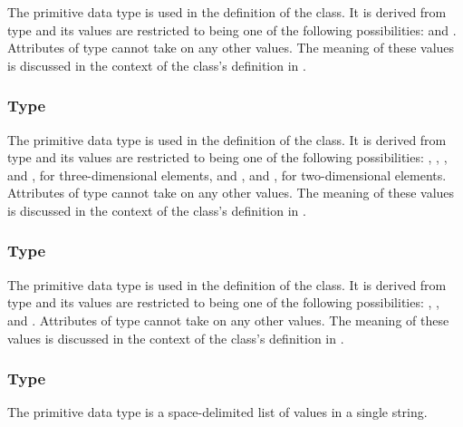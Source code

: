 The  primitive data type is used in the definition of the \ParametricObject class.  It is derived from type  and its values are restricted to being one of the following possibilities:  and .  Attributes of type  cannot take on any other values.  The meaning of these values is discussed in the context of the \ParametricObject class's definition in .


\subsubsection{Type \fixttspace{}}
\label{primtype-PrimitiveKind}

The  primitive data type is used in the definition of the \CSGPrimitive class.  It is derived from type  and its values are restricted to being one of the following possibilities: , , , and , for three-dimensional \CSGObject elements, and , and , for two-dimensional \CSGObject elements.  Attributes of type  cannot take on any other values.  The meaning of these values is discussed in the context of the \CSGPrimitive class's definition in .


\subsubsection{Type \fixttspace{}}
\label{primtype-SetOperation}

The  primitive data type is used in the definition of the \CSGSetOperator class.  It is derived from type  and its values are restricted to being one of the following possibilities: , , and .  Attributes of type  cannot take on any other values.  The meaning of these values is discussed in the context of the \CSGSetOperator class's definition in .


\subsubsection{Type \fixttspace{}}
\label{primtype-doubleArray}

The  primitive data type is a space-delimited list of  values in a single string.  

